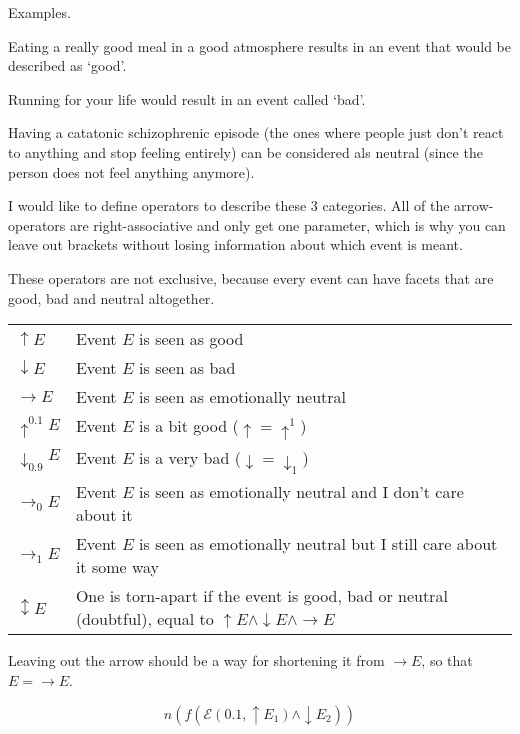 \documentclass{scrartcl}
\begin{document}
Examples.

Eating a really good meal in a good atmosphere results in an event that would be described as `good'. 

Running for your life would result in an event called `bad'.

Having a catatonic schizophrenic episode (the ones where people just don't react to anything and stop feeling entirely)
can be considered als neutral (since the person does not feel anything anymore).

I would like to define operators to describe these 3 categories. All of the arrow-operators are right-associative and
only get one parameter, which is why you can leave out brackets without losing information about which event is meant.

These operators are not exclusive, because every event can have facets that are good, bad and neutral altogether.

\begin{tabular}{l|l}
	$\uparrow E$ & Event $E$ is seen as good \\
	$\downarrow E$ & Event $E$ is seen as bad \\
	$\rightarrow E$ & Event $E$ is seen as emotionally neutral \\
	$\uparrow^{0.1} E$ & Event $E$ is a bit good ($\uparrow = \uparrow^1$) \\
	$\downarrow_{0.9} E$ & Event $E$ is a very bad ($\downarrow = \downarrow_1$) \\
	$\rightarrow_{0} E$ & Event $E$ is seen as emotionally neutral and I don't care about it\footnotemark\\
	$\rightarrow_{1} E$ & Event $E$ is seen as emotionally neutral but I still care about it some way\footnotemark \\
	$\updownarrow E$ & One is torn-apart if the event is good, bad or neutral (doubtful), equal to $\uparrow E \wedge \downarrow E \wedge \rightarrow E$
\end{tabular}


Leaving out the arrow should be a way for shortening it from $\rightarrow E$, so that $E = \rightarrow E$.

\begin{equation} n \left(f \left( \mathcal{E}(0.1, \uparrow E_1) \wedge \downarrow E_2 \right) \right) \end{equation}
\end{document}
